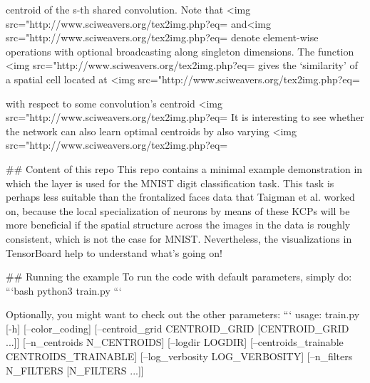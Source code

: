 centroid of the s-th shared convolution. Note that 
 <img src="http://www.sciweavers.org/tex2img.php?eq=%
 and<img src="http://www.sciweavers.org/tex2img.php?eq=%
 denote 
element-wise operations with optional broadcasting along singleton dimensions. The 
function <img src="http://www.sciweavers.org/tex2img.php?eq=%
gives the `similarity' of a spatial cell located at 
<img src="http://www.sciweavers.org/tex2img.php?eq=%

with respect to some convolution's centroid 
<img src="http://www.sciweavers.org/tex2img.php?eq=%
It is interesting to see whether the network can also learn optimal centroids by also varying <img src="http://www.sciweavers.org/tex2img.php?eq=%

## Content of this repo
This repo contains a minimal example demonstration in which the layer is used for the MNIST digit classification task. 
This task is perhaps less suitable than the frontalized faces data that Taigman et al. worked on, because the local 
specialization of neurons by means of these KCPs will be more beneficial if the spatial structure across the images in
the data is roughly consistent, which is not the case for MNIST. Nevertheless, the visualizations in TensorBoard
help to understand what's going on!

## Running the example
To run the code with default parameters, simply do:
```bash
python3 train.py
```

Optionally, you might want to check out the other parameters:
```
usage: train.py [-h] [--color_coding]
                [--centroid_grid CENTROID_GRID [CENTROID_GRID ...]]
                [--n_centroids N_CENTROIDS] [--logdir LOGDIR]
                [--centroids_trainable CENTROIDS_TRAINABLE]
                [--log_verbosity LOG_VERBOSITY]
                [--n_filters N_FILTERS [N_FILTERS ...]]

